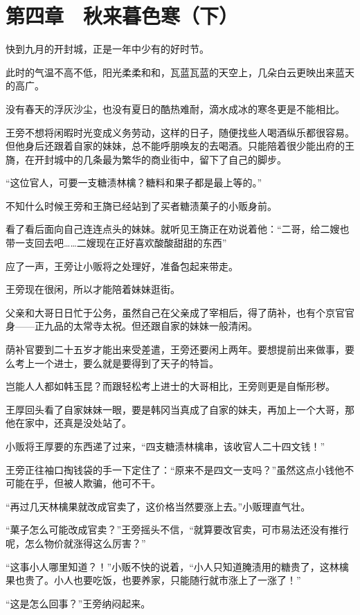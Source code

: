\section{第四章　秋来暮色寒（下）}

快到九月的开封城，正是一年中少有的好时节。

此时的气温不高不低，阳光柔柔和和，瓦蓝瓦蓝的天空上，几朵白云更映出来蓝天的高广。

没有春天的浮灰沙尘，也没有夏日的酷热难耐，滴水成冰的寒冬更是不能相比。

王旁不想将闲暇时光变成义务劳动，这样的日子，随便找些人喝酒纵乐都很容易。但他身后还跟着自家的妹妹，总不能呼朋唤友的去喝酒。只能陪着很少能出府的王旖，在开封城中的几条最为繁华的商业街中，留下了自己的脚步。

“这位官人，可要一支糖渍林檎？糖料和果子都是最上等的。”

不知什么时候王旁和王旖已经站到了买者糖渍菓子的小贩身前。

看了看后面向自己连连点头的妹妹。就听见王旖正在劝说着他：“二哥，给二嫂也带一支回去吧……二嫂现在正好喜欢酸酸甜甜的东西”

应了一声，王旁让小贩将之处理好，准备包起来带走。

王旁现在很闲，所以才能陪着妹妹逛街。

父亲和大哥日日忙于公务，虽然自己在父亲成了宰相后，得了荫补，也有个京官官身——正九品的太常寺太祝。但还跟自家的妹妹一般清闲。

荫补官要到二十五岁才能出来受差遣，王旁还要闲上两年。要想提前出来做事，要么考上一个进士，要么就是要得到了天子的特旨。

岂能人人都如韩玉昆？而跟轻松考上进士的大哥相比，王旁则更是自惭形秽。

王厚回头看了自家妹妹一眼，要是韩冈当真成了自家的妹夫，再加上一个大哥，那他在家中，还真是没处站了。

小贩将王厚要的东西递了过来，“四支糖渍林檎串，该收官人二十四文钱！”

王旁正往袖口掏钱袋的手一下定住了：“原来不是四文一支吗？”虽然这点小钱他不可能在乎，但被人欺骗，他可不干。

“再过几天林檎果就改成官卖了，这价格当然要涨上去。”小贩理直气壮。

“菓子怎么可能改成官卖？”王旁摇头不信，“就算要改官卖，可市易法还没有推行呢，怎么物价就涨得这么厉害？”

“这事小人哪里知道？！”小贩不快的说着，“小人只知道腌渍用的糖贵了，这林檎果也贵了。小人也要吃饭，也要养家，只能随行就市涨上了一涨了！”

“这是怎么回事？”王旁纳闷起来。

